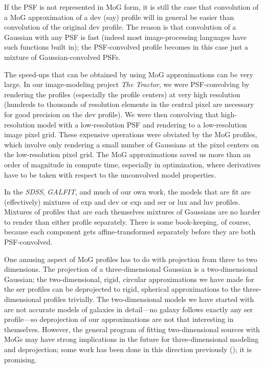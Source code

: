 \documentclass[12pt,pdftex,preprint]{aastex}
\newcommand{\project}[1]{\textsl{#1}}
\begin{document}
If the PSF is not represented in MoG form, it is still the case that
convolution of a MoG approximation of a dev (say) profile will in
general be easier than convolution of the original dev profile.  The
reason is that convolution of a Gaussian with any PSF is fast (indeed
most image-processing languages have such functions built in); the
PSF-convolved profile becomes in this case just a mixture of
Gaussian-convolved PSFs.

The speed-ups that can be obtained by using MoG approximations can be
very large.  In our image-modeling project \project{The Tractor}, we
were PSF-convolving by rendering the profiles (especially the profile
centers) at very high resolution (hundreds to thousands of resolution
elements in the central pixel are necessary for good precision on the
dev profile).  We were then convolving that high-resolution model with
a low-resolution PSF and rendering to a low-resolution image pixel
grid.  These expensive operations were obviated by the MoG profiles,
which involve only rendering a small number of Gaussians at the pixel
centers on the low-resolution pixel grid.  The MoG approximations
saved us more than an order of magnitude in compute time, especially
in optimization, where derivatives have to be taken with respect to
the unconvolved model properties.

In the \project{SDSS}, \project{GALFIT}, and much of our own work, the
models that are fit are (effectively) mixtures of exp and dev or exp
and ser or lux and luv profiles.  Mixtures of profiles that are each
themselves mixtures of Gaussians are no harder to render than either
profile separately.  There is some book-keeping, of course, because
each component gets affine-transformed separately before they are both
PSF-convolved.

One amusing aspect of MoG profiles has to do with projection from
three to two dimensions.  The projection of a three-dimensional
Gaussian is a two-dimensional Gaussian; the two-dimensional, rigid,
circular approximations we have made for the ser profiles can be
deprojected to rigid, spherical approximations to the
three-dimensional profiles trivially.  The two-dimensional models we
have started with are not accurate models of galaxies in detail---no
galaxy follows exactly any ser profile---so deprojection of our
approximations are not that interesting in themselves.  However, the
general program of fitting two-dimensional sources with MoGs may have
strong implications in the future for three-dimensional modeling and
deprojection; some work has been done in this direction previously
(\citealt{vdb}); it is promising.
\end{document}
